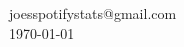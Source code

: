 \documentclass[12pt]{article}
\begin{document}
\pagestyle{empty}

% 

\vfill
\raggedleft
\normalsize
joesspotifystats@gmail.com\\
\today
    
\end{document}
